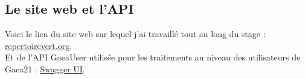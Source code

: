 \subsection{Le site web et l'API}

Voici le lien du site web sur lequel j'ai travaillé tout au long du stage : \href{https://www.repertoirevert.org/}{repertoirevert.org}.\\

Et de l'API GaeaUser utilisée pour les traitements au niveau des utilisateurs de Gaea21 : \href{https://gaea21user.sustlivprogram.org/swagger/}{Swagger UI}.
